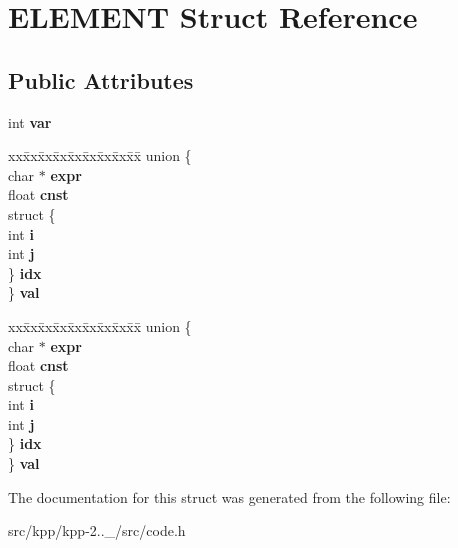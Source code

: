 \hypertarget{structELEMENT}{}\section{E\+L\+E\+M\+E\+NT Struct Reference}
\label{structELEMENT}
\subsection*{Public Attributes}
\begin{DoxyCompactItemize}
\item 
\mbox{\label{structELEMENT_ade57e6059c9662cf79c4e363cc2a252a}} 
int {\bfseries var}
\item 
\mbox{\label{structELEMENT_ac57a0fb3d4ac615d204a637d3d5d0dfc}} 
\begin{tabbing}
xx\=xx\=xx\=xx\=xx\=xx\=xx\=xx\=xx\=\kill
union \{\\
\>char $\ast$ {\bfseries expr}\\
\>float {\bfseries cnst}\\
\>struct \{\\
\>\>int {\bfseries i}\\
\>\>int {\bfseries j}\\
\>\} {\bfseries idx}\\
\} {\bfseries val}\\

\end{tabbing}\item 
\mbox{\label{structELEMENT_adb82555375fa46f43f087190bec133a8}} 
\begin{tabbing}
xx\=xx\=xx\=xx\=xx\=xx\=xx\=xx\=xx\=\kill
union \{\\
\>char $\ast$ {\bfseries expr}\\
\>float {\bfseries cnst}\\
\>struct \{\\
\>\>int {\bfseries i}\\
\>\>int {\bfseries j}\\
\>\} {\bfseries idx}\\
\} {\bfseries val}\\

\end{tabbing}\end{DoxyCompactItemize}


The documentation for this struct was generated from the following file\+:\begin{DoxyCompactItemize}
\item 
src/kpp/kpp-\/2..\+\_/src/code.\+h\end{DoxyCompactItemize}

